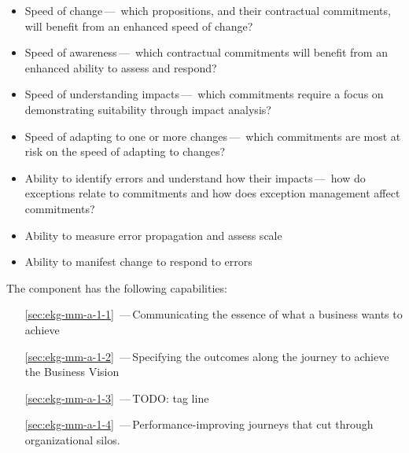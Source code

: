 \begin{itemize}
    \item Speed of change\,---\,%
    which propositions, and their contractual commitments, will benefit from an enhanced speed of change?

    \item Speed of awareness\,---\,%
    which contractual commitments will benefit from an enhanced ability to assess and respond?

    \item Speed of understanding impacts\,---\,%
    which commitments require a focus on demonstrating suitability through impact analysis?

    \item Speed of adapting to one or more changes\,---\,%
    which commitments are most at risk on the speed of adapting to changes?

    \item Ability to identify errors and understand how their impacts\,---\,%
          how do exceptions relate to commitments and how does exception management affect commitments?
    \item Ability to measure error propagation and assess scale
    \item Ability to manifest change to respond to errors
\end{itemize}

The  component has the following capabilities:

\begin{itemize}[leftmargin=.5in]
  \item [\ref{sec:ekg-mm-a-1-1}] \,---\,Communicating the essence of what a business wants to achieve
  \item [\ref{sec:ekg-mm-a-1-2}] \,---\,Specifying the outcomes along the journey to achieve the Business Vision
  \item [\ref{sec:ekg-mm-a-1-3}] \,---\,TODO: tag line
  \item [\ref{sec:ekg-mm-a-1-4}] \,---\,Performance-improving journeys that cut through organizational silos.
\end{itemize}





